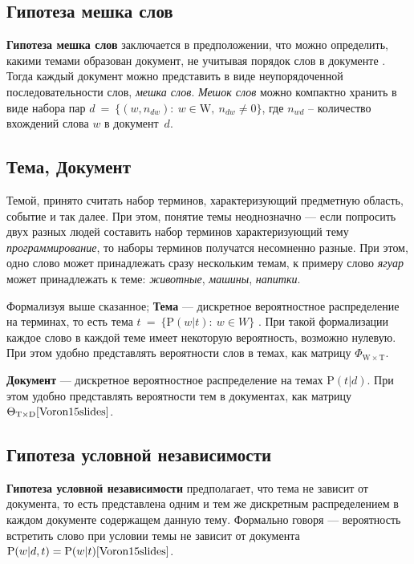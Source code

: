 \documentclass[a4paper, 14pt]{extarticle}
\begin{document}
	\subsection{Гипотеза мешка слов}
	 {\bf Гипотеза мешка слов} заключается в предположении, что можно определить, какими темами образован документ, не учитывая порядок слов в документе \cite{Voron15slides}. Тогда каждый документ можно представить в виде неупорядоченной последовательности слов, \emph{мешка слов}. \emph{Мешок слов} можно компактно хранить в виде набора пар $d~=~\{(w, n_{dw}):~w \in \mathrm{W},~n_{dw} \neq 0\}$, где $n_{wd}$ -- количество вхождений слова $w$ в документ~$d$. 
	   	
    \subsection{Тема, Документ}
    Темой, принято считать набор терминов, характеризующий предметную область, событие и так далее. При этом, понятие темы неоднозначно --- если попросить двух разных людей составить набор терминов характеризующий тему {\it программирование}, то наборы терминов получатся несомненно разные. При этом, одно слово может принадлежать сразу нескольким темам, к примеру слово  {\it ягуар} может принадлежать к теме:  {\it животные},  {\it машины}, {\it напитки}.
    
   	Формализуя выше сказанное; {\bf Тема} --- дискретное вероятностное распределение на терминах, то есть тема $t~=~\{\mathrm{P}(w|t):~w \in W\}$ \cite{Voron15slides}. При такой формализации каждое слово в каждой теме имеет некоторую вероятность, возможно нулевую. При этом удобно представлять вероятности слов в темах, как матрицу $\Phi_{\mathrm{W} \times \mathrm{T}}$.
   	
   	{\bf Документ} --- дискретное вероятностное распределение на темах $\mathrm{P}(t|d)$\cite{Voron15slides}. При этом удобно представлять вероятности тем в документах, как матрицу $\Theta_{\mathrm{T} \times \mathrm{D}}\cite{Voron15slides}$.
   	
   	\subsection{Гипотеза условной независимости}
   	   	{\bf Гипотеза условной независимости} предполагает, что тема не зависит от документа, то есть представлена одним и тем же дискретным распределением в каждом документе содержащем данную тему. Формально говоря --- вероятность встретить слово при условии темы не зависит от документа $\mathrm{P}(w|d, t)= \mathrm{P}(w|t) \cite{Voron15slides}$. 
   	
\end{document}

